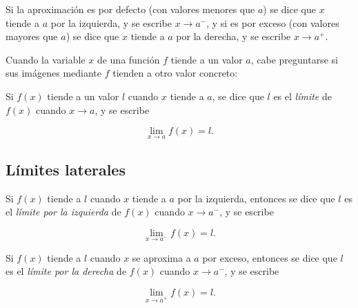 \documentclass[
  a4paper,
]{scrreport}
\theoremstyle{plain}
\theoremstyle{plain}
\theoremstyle{definition}
\theoremstyle{definition}
\theoremstyle{plain}
\theoremstyle{remark}
\begin{document}
Si la aproximación es por defecto (con valores menores que \(a\)) se
dice que \(x\) tiende a \(a\) por la izquierda, y se escribe
\(x\to a^-\), y si es por exceso (con valores mayores que \(a\)) se dice
que \(x\) tiende a \(a\) por la derecha, y se escribe \(x\to a^+\).

Cuando la variable \(x\) de una función \(f\) tiende a un valor \(a\),
cabe preguntarse si sus imágenes mediante \(f\) tienden a otro valor
concreto:

Si \(f(x)\) tiende a un valor \(l\) cuando \(x\) tiende a \(a\), se dice
que \(l\) es el \emph{límite} de \(f(x)\) cuando \(x\to a\), y se
escribe

\[\lim_{x\to a}f(x)=l.\]

\hypertarget{luxedmites-laterales}{%
\subsection{Límites laterales}\label{luxedmites-laterales}}

Si \(f(x)\) tiende a \(l\) cuando \(x\) tiende a \(a\) por la izquierda,
entonces se dice que \(l\) es el \emph{límite por la izquierda} de
\(f(x)\) cuando \(x\to a^-\), y se escribe

\[\lim_{x\to a^-}f(x)=l.\]

Si \(f(x)\) tiende a \(l\) cuando \(x\) se aproxima a \(a\) por exceso,
entonces se dice que \(l\) es el \emph{límite por la derecha} de
\(f(x)\) cuando \(x\to a^-\), y se escribe

\[\lim_{x\to a^+}f(x)=l.\]
\end{document}
